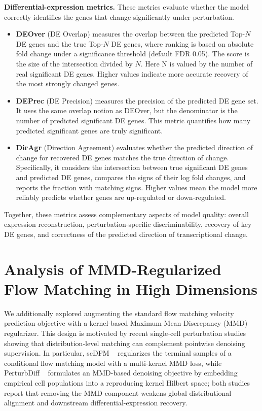 \documentclass[11pt]{article}
\begin{document}
\textbf{Differential-expression metrics.} These metrics evaluate whether the model correctly identifies the genes that change significantly under perturbation.

\begin{itemize}
  \item \textbf{DEOver} (DE Overlap) measures the overlap between the predicted Top-$N$ DE genes and the true Top-$N$ DE genes, where ranking is based on absolute fold change under a significance threshold (default FDR 0.05). The score is the size of the intersection divided by $N$. Here N is valued by the number of real significant DE genes. Higher values indicate more accurate recovery of the most strongly changed genes.
  \item \textbf{DEPrec} (DE Precision) measures the precision of the predicted DE gene set. It uses the same overlap notion as DEOver, but the denominator is the number of predicted significant DE genes. This metric quantifies how many predicted significant genes are truly significant.
  \item \textbf{DirAgr} (Direction Agreement) evaluates whether the predicted direction of change for recovered DE genes matches the true direction of change. Specifically, it considers the intersection between true significant DE genes and predicted DE genes, compares the signs of their log fold changes, and reports the fraction with matching signs. Higher values mean the model more reliably predicts whether genes are up-regulated or down-regulated.
\end{itemize}

Together, these metrics assess complementary aspects of model quality: overall expression reconstruction, perturbation-specific discriminability, recovery of key DE genes, and correctness of the predicted direction of transcriptional change.

\section{Analysis of MMD-Regularized Flow Matching in High Dimensions}

We additionally explored augmenting the standard flow matching velocity prediction objective with a kernel-based Maximum Mean Discrepancy (MMD) regularizer. This design is motivated by recent single-cell perturbation studies showing that distribution-level matching can complement pointwise denoising supervision. In particular, scDFM ~\cite{yu2026scdfm} regularizes the terminal samples of a conditional flow matching model with a multi-kernel MMD loss, while PerturbDiff ~\cite{yuan2026perturbdiff} formulates an MMD-based denoising objective by embedding empirical cell populations into a reproducing kernel Hilbert space; both studies report that removing the MMD component weakens global distributional alignment and downstream differential-expression recovery. 
\end{document}
